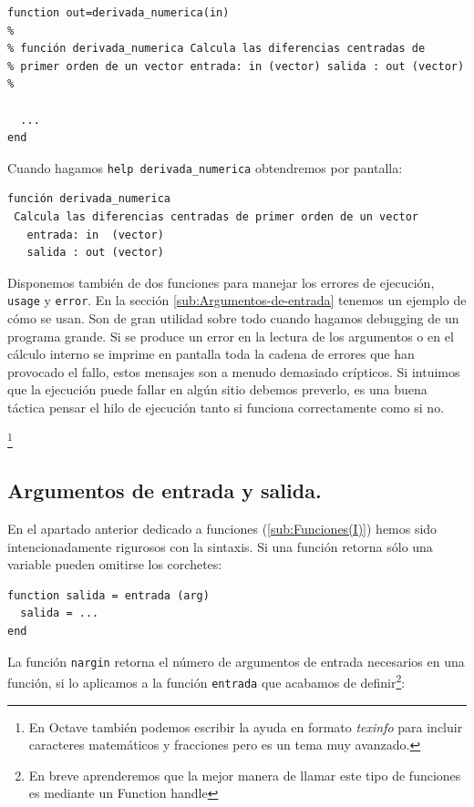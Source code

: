 \begin{verbatim}
function out=derivada_numerica(in)   
%   
% función derivada_numerica Calcula las diferencias centradas de
% primer orden de un vector entrada: in (vector) salida : out (vector)
%
   
  ...   
end 
\end{verbatim}
Cuando hagamos \texttt{help derivada\_numerica} obtendremos por
pantalla:

\begin{verbatim}
función derivada_numerica   
 Calcula las diferencias centradas de primer orden de un vector   
   entrada: in  (vector)   
   salida : out (vector)
\end{verbatim}

Disponemos también de dos funciones para manejar los errores de
ejecución, \texttt{usage} y \texttt{error}. En la sección
\ref{sub:Argumentos-de-entrada} tenemos un ejemplo de cómo se usan.
Son de gran utilidad sobre todo cuando hagamos debugging de un
programa grande. Si se produce un error en la lectura de los
argumentos o en el cálculo interno se imprime en pantalla toda la
cadena de errores que han provocado el fallo, estos mensajes son a
menudo demasiado crípticos. Si intuimos que la ejecución puede fallar
en algún sitio debemos preverlo, es una buena táctica pensar el hilo
de ejecución tanto si funciona correctamente como si no.

%
\footnote{En Octave también podemos escribir la ayuda en formato
  \emph{texinfo} para incluir caracteres matemáticos y fracciones pero
  es un tema muy avanzado.%
}


\subsection{Argumentos de entrada y
  salida.\label{sub:Argumentos-de-entrada}}

En el apartado anterior dedicado a funciones (\ref{sub:Funciones(I)})
hemos sido intencionadamente rigurosos con la sintaxis. Si una función
retorna sólo una variable pueden omitirse los corchetes:

\begin{verbatim}
function salida = entrada (arg)
  salida = ...
end
\end{verbatim}
La función \texttt{nargin} retorna el número de
argumentos de entrada necesarios en una función, si lo aplicamos a la
función \texttt{entrada} que acabamos de definir\footnote{En breve
  aprenderemos que la mejor manera de llamar este tipo de funciones es
  mediante un Function handle}:

